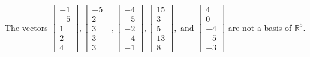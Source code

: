 \begin{exercise}
\begin{exerciseStatement}
  \end{exerciseStatement}
  \begin{exerciseAnswer}
   The vectors \(\left[\begin{array}{r}
-1 \\
-5 \\
1 \\
2 \\
4
\end{array}\right] , \left[\begin{array}{r}
-5 \\
2 \\
3 \\
3 \\
3
\end{array}\right] , \left[\begin{array}{r}
-4 \\
-5 \\
-2 \\
-4 \\
-1
\end{array}\right] , \left[\begin{array}{r}
15 \\
3 \\
5 \\
13 \\
8
\end{array}\right] , \text{ and } \left[\begin{array}{r}
4 \\
0 \\
-4 \\
-5 \\
-3
\end{array}\right]\) 
  	 are not  a basis of \(\mathbb{R}^5\).
  


  \end{exerciseAnswer}
\end{exercise}